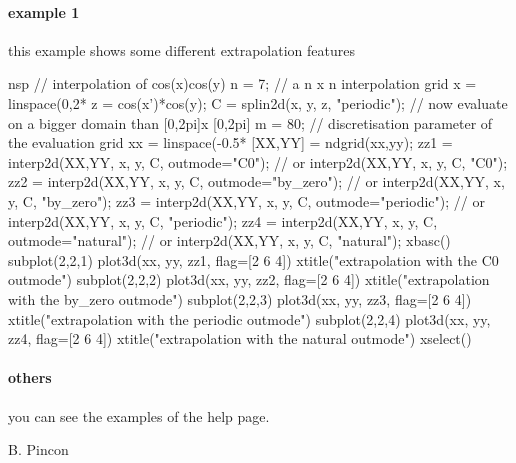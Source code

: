 
\begin{examples}

\paragraph{example 1} this example shows some different extrapolation features
\begin{mintednsp}{nsp}
// interpolation of cos(x)cos(y)
n = 7;  // a n x n interpolation grid
x = linspace(0,2*%
z = cos(x')*cos(y);
C = splin2d(x, y, z, "periodic");
// now evaluate on a bigger domain than [0,2pi]x [0,2pi]
m = 80; // discretisation parameter of the evaluation grid
xx = linspace(-0.5*%
[XX,YY] = ndgrid(xx,yy);
zz1 = interp2d(XX,YY, x, y, C, outmode="C0"); // or interp2d(XX,YY, x, y, C, "C0");
zz2 = interp2d(XX,YY, x, y, C, outmode="by_zero"); // or interp2d(XX,YY, x, y, C, "by_zero");
zz3 = interp2d(XX,YY, x, y, C, outmode="periodic"); // or interp2d(XX,YY, x, y, C, "periodic");
zz4 = interp2d(XX,YY, x, y, C, outmode="natural"); // or interp2d(XX,YY, x, y, C, "natural");
xbasc()
subplot(2,2,1)
  plot3d(xx, yy, zz1, flag=[2 6 4])
  xtitle("extrapolation with the C0 outmode")
subplot(2,2,2)
  plot3d(xx, yy, zz2, flag=[2 6 4])
  xtitle("extrapolation with the by_zero outmode")
subplot(2,2,3)
  plot3d(xx, yy, zz3, flag=[2 6 4])
  xtitle("extrapolation with the periodic outmode")
subplot(2,2,4)
  plot3d(xx, yy, zz4, flag=[2 6 4])
  xtitle("extrapolation with the natural outmode")
xselect()
\end{mintednsp}

\paragraph{others} you can see the examples of the
 help page.

\end{examples}

\begin{manseealso}
\end{manseealso}

\begin{authors}
B. Pincon
\end{authors}


